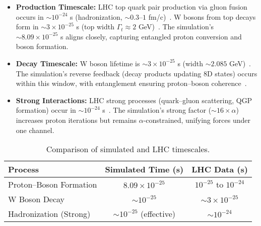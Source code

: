 \documentclass[pdflatex,sn-mathphys-num]{sn-jnl}
\theoremstyle{thmstyleone}
\theoremstyle{thmstyletwo}
\theoremstyle{thmstylethree}
\begin{document}
\begin{itemize}
    \item \textbf{Production Timescale:} LHC top quark pair production via gluon fusion occurs in $\sim 10^{-24}$ s (hadronization, $\sim 0.3$--$1$ fm/c)~\cite{alice2017femto}. W bosons from top decays form in $\sim 3 \times 10^{-25}$ s (top width $\Gamma_t \approx 2$ GeV)~\cite{atlas2015top}. The simulation's $\sim 8.09 \times 10^{-25}$ s aligns closely, capturing entangled proton conversion and boson formation.
   
    \item \textbf{Decay Timescale:} W boson lifetime is $\sim 3 \times 10^{-25}$ s (width $\sim 2.085$ GeV)~\cite{cms2018w}. The simulation's reverse feedback (decay products updating 8D states) occurs within this window, with entanglement ensuring proton--boson coherence~\cite{atlas2022entanglement}.
   
    \item \textbf{Strong Interactions:} LHC strong processes (quark--gluon scattering, QGP formation) occur in $\sim 10^{-24}$ s~\cite{alice2017femto}. The simulation's strong factor ($\sim 16 \times \alpha$) increases proton iterations but remains $\alpha$-constrained, unifying forces under one channel.
    
\end{itemize}


\begin{table}[h]
\centering
\caption{Comparison of simulated and LHC timescales.}
\label{tab:s2-timescales}
\begin{tabular}{@{}lcc@{}}
\toprule
\textbf{Process} & \textbf{Simulated Time (s)} & \textbf{LHC Data (s)} \\
\midrule
Proton--Boson Formation & $8.09 \times 10^{-25}$ & $10^{-25}$ to $10^{-24}$ \\
W Boson Decay & $\sim 10^{-25}$ & $\sim 3 \times 10^{-25}$ \\
Hadronization (Strong) & $\sim 10^{-25}$ (effective) & $\sim 10^{-24}$ \\
\bottomrule
\end{tabular}
\end{table}
\end{document}
